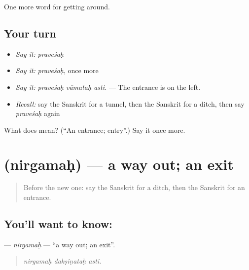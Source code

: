 \begin{grammarlens}[title={What you've built}]
One more word for getting around.
\end{grammarlens}

\subsection*{Your turn}
\begin{itemize}
\raggedright
  \item \emph{Say it:} \emph{praveśaḥ}
  \item \emph{Say it:} \emph{praveśaḥ}, once more
  \item \emph{Say it:} \emph{praveśaḥ vāmataḥ asti.} — The entrance is on the left.
  \item \emph{Recall:} say the Sanskrit for a tunnel, then the Sanskrit for a ditch, then say \emph{praveśaḥ} again
\end{itemize}

\begin{tcolorbox}[breakable,colback=teal!4,colframe=teal!35!black,title={Before you move on}]
What does  mean? (\textquotedblleft{}An entrance; entry\textquotedblright{}.) Say it once more.
\end{tcolorbox}
\section[\texorpdfstring{\sk{निर्गमः} (nirgamaḥ)}{निर्गमः (nirgamaḥ)}]{ (nirgamaḥ) — a way out; an exit}

\label{lesson:SA-C423-nirgamah}



\begin{quote}
Before the new one: say the Sanskrit for a ditch, then the Sanskrit for an entrance.
\end{quote}

\subsection*{You'll want to know: }
\textbf{} — \emph{nirgamaḥ} — \textquotedblleft{}a way out; an exit\textquotedblright{}.

\begin{quote}
  
\end{quote}

\begin{quote}
\emph{nirgamaḥ dakṣiṇataḥ asti.}
\end{quote}

